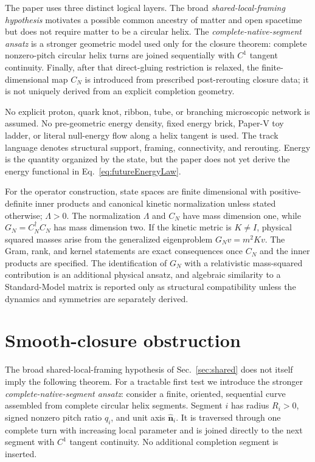 \documentclass[10pt]{article}
\begin{document}
The paper uses three distinct logical layers. The broad \emph{shared-local-framing hypothesis} motivates a possible common ancestry of matter and open spacetime but does not require matter to be a circular helix. The \emph{complete-native-segment ansatz} is a stronger geometric model used only for the closure theorem: complete nonzero-pitch circular helix turns are joined sequentially with $C^1$ tangent continuity. Finally, after that direct-gluing restriction is relaxed, the finite-dimensional map $C_N$ is introduced from prescribed post-rerouting closure data; it is not uniquely derived from an explicit completion geometry.

No explicit proton, quark knot, ribbon, tube, or branching microscopic network is assumed. No pre-geometric energy density, fixed energy brick, Paper-V toy ladder, or literal null-energy flow along a helix tangent is used. The track language denotes structural support, framing, connectivity, and rerouting. Energy is the quantity organized by the state, but the paper does not yet derive the energy functional in Eq.~\eqref{eq:futureEnergyLaw}.

For the operator construction, state spaces are finite dimensional with positive-definite inner products and canonical kinetic normalization unless stated otherwise; $\Lambda>0$. The normalization $\Lambda$ and $C_N$ have mass dimension one, while $G_N=C_N^\dagger C_N$ has mass dimension two. If the kinetic metric is $K\neq I$, physical squared masses arise from the generalized eigenproblem $G_Nv=m^2Kv$. The Gram, rank, and kernel statements are exact consequences once $C_N$ and the inner products are specified. The identification of $G_N$ with a relativistic mass-squared contribution is an additional physical ansatz, and algebraic similarity to a Standard-Model matrix is reported only as structural compatibility unless the dynamics and symmetries are separately derived.

\section{Smooth-closure obstruction}
\label{sec:obstruction}

The broad shared-local-framing hypothesis of Sec.~\ref{sec:shared} does not itself imply the following theorem. For a tractable first test we introduce the stronger \emph{complete-native-segment ansatz}: consider a finite, oriented, sequential curve assembled from complete circular helix segments. Segment $i$ has radius $R_i>0$, signed nonzero pitch ratio $q_i$, and unit axis $\hat{\bm n}_i$. It is traversed through one complete turn with increasing local parameter and is joined directly to the next segment with $C^1$ tangent continuity. No additional completion segment is inserted.
\end{document}
